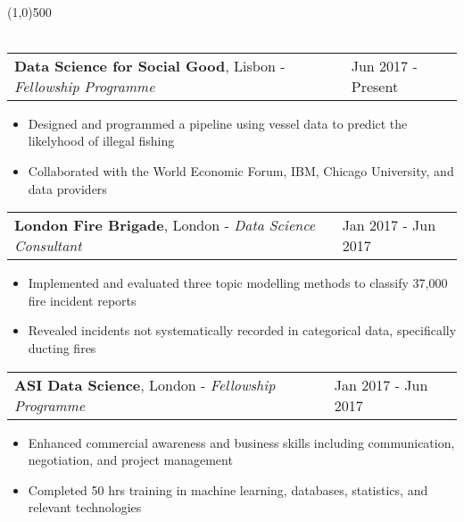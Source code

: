 \documentclass[11pt]{res}
\begin{document}
\vspace{-1.2em}
\begin{flushleft}
\\
\end{flushleft}
\vspace{-3.2em}

\line(1,0){500}\\
\vspace*{-0.3cm}
\nolinebreak\\
\begin{tabular}{@{} p{13.7cm} p{3.5cm} @{}} {\bf Data Science for Social Good}, Lisbon - \emph{Fellowship Programme} & Jun 2017 - Present \end{tabular}
\vspace{-1.0em}
\textcolor{mygray}{ %
\begin{itemize} %
\item \textmd{Designed and programmed a pipeline using vessel data to predict the likelyhood of illegal fishing}
\item \textmd{Collaborated with the World Economic Forum, IBM, Chicago University, and data providers}
\end{itemize}
}
\vspace{-1.0em}
\begin{tabular}{@{} p{13.7cm} p{3.5cm} @{}} {\bf London Fire Brigade}, London - \emph{Data Science Consultant} & Jan 2017 - Jun 2017 \end{tabular}
\vspace{-1.0em}
\textcolor{mygray}{
\begin{itemize} %
\item \textmd{Implemented and evaluated three topic modelling methods to classify 37,000 fire incident reports}
\item \textmd{Revealed incidents not systematically recorded in categorical data, specifically ducting fires}
\end{itemize}
}
\vspace{-1.0em}
\begin{tabular}{@{} p{13.7cm} p{3.5cm} @{}} {\bf ASI Data Science}, London - \emph{Fellowship Programme} & Jan 2017 - Jun 2017 \end{tabular}
\vspace{-1.0em}
\textcolor{mygray}{
\begin{itemize} %
\item \textmd{Enhanced commercial awareness and  business skills including communication, negotiation, and project management}
\item \textmd{Completed 50 hrs training in machine learning, databases, statistics, and relevant technologies}
\end{itemize}
}
\end{document}

